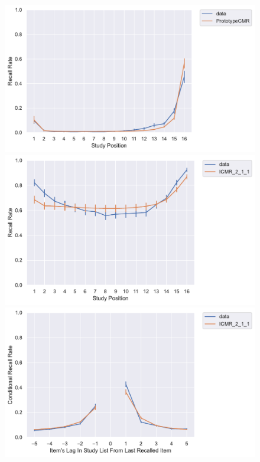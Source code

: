 \documentclass[
  letterpaper,
  DIV=11,
  numbers=noendperiod]{scrreport}
\begin{document}
\begin{figure}
\begin{minipage}[c]{0.33\linewidth}
{\includegraphics{./figures/HealyKahana2014_PrototypeCMR_ll16_pfr.pdf}

}

\end{minipage}%
\newline
\begin{minipage}[c]{0.33\linewidth}

{\centering 

\includegraphics{./figures/HealyKahana2014_ICMR_2_1_1_ll16_spc.pdf}

}

\end{minipage}%
%
\begin{minipage}[c]{0.33\linewidth}

{\centering 

\includegraphics{./figures/HealyKahana2014_ICMR_2_1_1_ll16_crp.pdf}

}
\end{minipage}
\end{figure}
\end{document}

